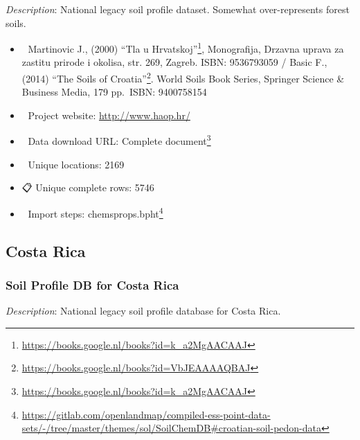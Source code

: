\documentclass[
  graybox,natbib,nospthms]{svmono}
\providecommand{\tightlist}{%
  \setlength{\itemsep}{0pt}\setlength{\parskip}{0pt}}
\providecommand{\tightlist}{\setlength{\itemsep}{0pt}\setlength{\parskip}{0pt}}
\renewcommand{\href}[2]{#2 (\url{#1})}
\renewcommand{\href}[2]{#2\footnote{\url{#1}}}
\begin{document}
\emph{Description}: National legacy soil profile dataset. Somewhat over-represents forest soils.

\begin{itemize}
\tightlist
\item
  📕 Martinovic J., (2000) \href{https://books.google.nl/books?id=k_a2MgAACAAJ}{``Tla u Hrvatskoj''}, Monografija, Drzavna uprava za zastitu prirode i okolisa, str. 269, Zagreb. ISBN: 9536793059 / Basic F., (2014) \href{https://books.google.nl/books?id=VbJEAAAAQBAJ}{``The Soils of Croatia''}. World Soils Book Series, Springer Science \& Business Media, 179 pp.~ISBN: 9400758154\\
\item
  🔗 Project website: \url{http://www.haop.hr/}\\
\item
  📂 Data download URL: \href{https://books.google.nl/books?id=k_a2MgAACAAJ}{Complete document}\\
\item
  📍 Unique locations: 2169\\
\item
  📋 Unique complete rows: 5746\\
\item
  📝 Import steps: \href{https://gitlab.com/openlandmap/compiled-ess-point-data-sets/-/tree/master/themes/sol/SoilChemDB\#croatian-soil-pedon-data}{chemsprops.bpht}
\end{itemize}

\hypertarget{costa-rica}{%
\subsection{Costa Rica}\label{costa-rica}}

\hypertarget{soil-profile-db-for-costa-rica}{%
\subsubsection{Soil Profile DB for Costa Rica}\label{soil-profile-db-for-costa-rica}}

\emph{Description}: National legacy soil profile database for Costa Rica.
\end{document}
